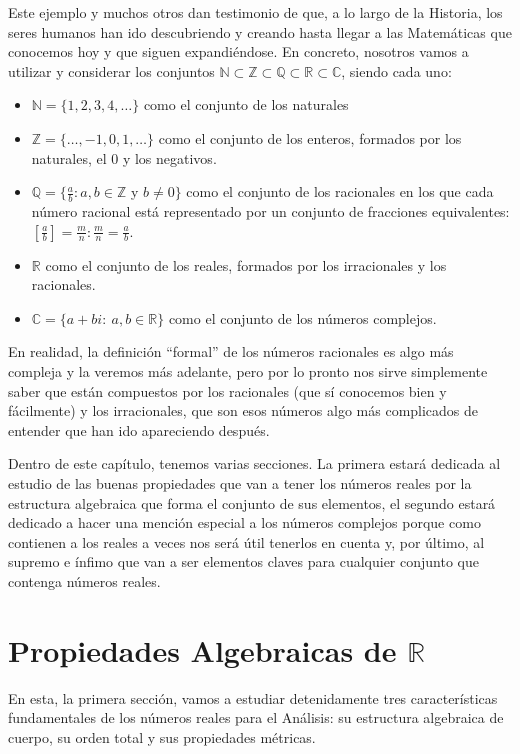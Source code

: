 \documentclass[10pt,a4paper,openright]{book}
\theoremstyle{break}
\begin{document}
Este ejemplo y muchos otros dan testimonio de que, a lo largo de la Historia, los seres humanos han ido descubriendo y creando hasta llegar a las Matemáticas que conocemos hoy y que siguen expandiéndose. En concreto, nosotros vamos a utilizar y considerar los conjuntos $\mathbb N\subset \mathbb Z\subset \mathbb Q\subset \mathbb R\subset \mathbb C$, siendo cada uno:
\begin{itemize}
\item $\mathbb N = \{1,2,3,4, \ldots\}$ como el conjunto de los naturales
\item $\mathbb Z = \{\ldots, -1, 0 ,1, \ldots\}$ como el conjunto de los enteros, formados por los naturales, el 0 y los negativos.
\item $\mathbb Q=\{\frac{a}{b}: a,b\in \mathbb Z$ y $b\neq 0\}$ como el conjunto de los racionales en los que cada número racional está representado por un conjunto de fracciones equivalentes: $\left[\frac{a}{b}\right]={\frac{m}{n}: \frac{m}{n}=\frac{a}{b}}$.
\item $\mathbb{R}$ como el conjunto de los reales, formados por los irracionales y los racionales.
\item $\mathbb C = \{a + bi : \ a, b\in \mathbb R\}$ como el conjunto de los números complejos.
\end{itemize}

En realidad, la definición ``formal'' de los números racionales es algo más compleja y la veremos más adelante, pero por lo pronto nos sirve simplemente saber que están compuestos por los racionales (que sí conocemos bien y fácilmente) y los irracionales, que son esos números algo más complicados de entender que han ido apareciendo después.

Dentro de este capítulo, tenemos varias secciones. La primera estará dedicada al estudio de las buenas propiedades que van a tener los números reales por la estructura algebraica que forma el conjunto de sus elementos, el segundo estará dedicado a hacer una mención especial a los números complejos porque como contienen a los reales a veces nos será útil tenerlos en cuenta y, por último, al supremo e ínfimo que van a ser elementos claves para cualquier conjunto que contenga números reales.

\section{Propiedades Algebraicas de $\mathbb R$}
En esta, la primera sección, vamos a estudiar detenidamente tres características fundamentales de los números reales para el Análisis: su estructura algebraica de cuerpo, su orden total y sus propiedades métricas.
\end{document}

